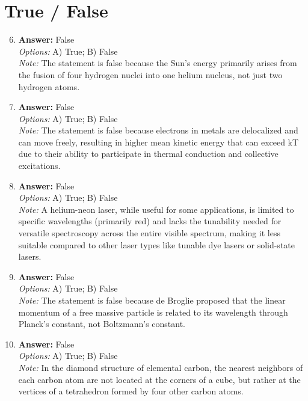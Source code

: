 \documentclass[12pt]{article}
\begin{document}
\section*{True / False}
\begin{enumerate}[label=\arabic*.]
\setcounter{enumi}{5}
\item \textbf{Answer:} False
\\ \textit{Options:} A) True; B) False
\\ \textit{Note:} The statement is false because the Sun's energy primarily arises from the fusion of four hydrogen nuclei into one helium nucleus, not just two hydrogen atoms.
\item \textbf{Answer:} False
\\ \textit{Options:} A) True; B) False
\\ \textit{Note:} The statement is false because electrons in metals are delocalized and can move freely, resulting in higher mean kinetic energy that can exceed kT due to their ability to participate in thermal conduction and collective excitations.
\item \textbf{Answer:} False
\\ \textit{Options:} A) True; B) False
\\ \textit{Note:} A helium-neon laser, while useful for some applications, is limited to specific wavelengths (primarily red) and lacks the tunability needed for versatile spectroscopy across the entire visible spectrum, making it less suitable compared to other laser types like tunable dye lasers or solid-state lasers.
\item \textbf{Answer:} False
\\ \textit{Options:} A) True; B) False
\\ \textit{Note:} The statement is false because de Broglie proposed that the linear momentum of a free massive particle is related to its wavelength through Planck's constant, not Boltzmann's constant.
\item \textbf{Answer:} False
\\ \textit{Options:} A) True; B) False
\\ \textit{Note:} In the diamond structure of elemental carbon, the nearest neighbors of each carbon atom are not located at the corners of a cube, but rather at the vertices of a tetrahedron formed by four other carbon atoms.
\end{enumerate}
\end{document}
